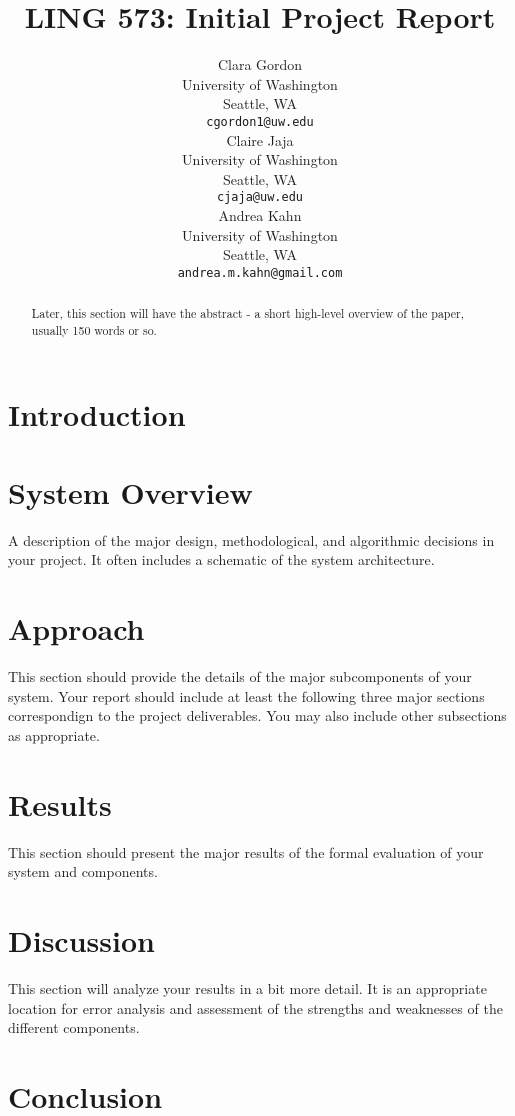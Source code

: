 \documentclass[11pt]{article}
\title{LING 573: Initial Project Report}
\author{Clara Gordon \\
  University of Washington \\
  Seattle, WA \\
  {\tt cgordon1@uw.edu} \\\And
  Claire Jaja \\
  University of Washington \\
  Seattle, WA \\
  {\tt cjaja@uw.edu} \\\And
  Andrea Kahn \\
  University of Washington \\
  Seattle, WA \\
  {\tt andrea.m.kahn@gmail.com} \\}
\date{}
\begin{document}
\maketitle
\begin{abstract}
    Later, this section will have the abstract - a short high-level overview of the paper, usually 150 words or so.
\end{abstract}

\section{Introduction}

\section{System Overview}

A description of the major design, methodological, and algorithmic decisions in your project. It often includes a schematic of the system architecture.

\section{Approach}

This section should provide the details of the major subcomponents of your system. Your report should include at least the following three major sections correspondign to the project deliverables. You may also include other subsections as appropriate.

\section{Results}

This section should present the major results of the formal evaluation of your system and components.

\section{Discussion}

This section will analyze your results in a bit more detail. It is an appropriate location for error analysis and assessment of the strengths and weaknesses of the different components.

\section{Conclusion}

\nocite{*}




\end{document}
